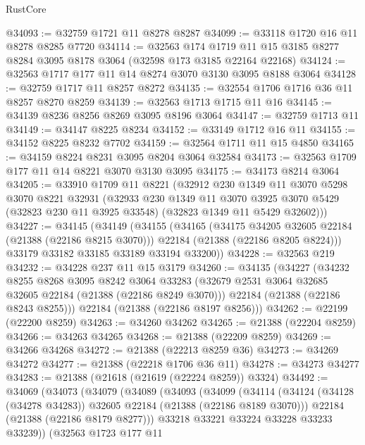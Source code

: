 \begin{lexlean}{RustCore}
\begin{coremodule}
@34093 := @32759 @1721 @11 @8278 @8287
@34099 := @33118 @1720 @16 @11 @8278 @8285 @7720
@34114 := @32563
    @174
    @1719
    @11
    @15
    @3185
    @8277
    @8284
    @3095
    @8178
    @3064
    (@32598 @173 @3185 @22164 @22168)
@34124 := @32563 @1717 @177 @11 @14 @8274 @3070 @3130 @3095 @8188 @3064
@34128 := @32759 @1717 @11 @8257 @8272
@34135 := @32554 @1706 @1716 @36 @11 @8257 @8270 @8259
@34139 := @32563 @1713 @1715 @11 @16
@34145 := @34139 @8236 @8256 @8269 @3095 @8196 @3064
@34147 := @32759 @1713 @11
@34149 := @34147 @8225 @8234
@34152 := @33149 @1712 @16 @11
@34155 := @34152 @8225 @8232 @7702
@34159 := @32564 @1711 @11 @15 @4850
@34165 := @34159 @8224 @8231 @3095 @8204 @3064 @32584
@34173 := @32563 @1709 @177 @11 @14 @8221 @3070 @3130 @3095
@34175 := @34173 @8214 @3064
@34205 := @33910
    @1709
    @11
    @8221
    (@32912
      @230
      @1349
      @11
      @3070
      @5298
      @3070
      @8221
      @32931
      (@32933
        @230
        @1349
        @11
        @3070
        @3925
        @3070
        @5429
        (@32823 @230 @11 @3925 @33548)
        (@32823 @1349 @11 @5429 @32602)))
@34227 := @34145
    (@34149
      (@34155
        (@34165
          (@34175 @34205 @32605 @22184 (@21388 (@22186 @8215 @3070)))
          @22184
          (@21388 (@22186 @8205 @8224)))
        @33179
        @33182
        @33185
        @33189
        @33194
        @33200))
@34228 := @32563 @219
@34232 := @34228 @237 @11 @15 @3179
@34260 := @34135
    (@34227
      (@34232
        @8255
        @8268
        @3095
        @8242
        @3064
        @33283
        (@32679 @2531 @3064 @32685 @32605 @22184 (@21388 (@22186 @8249 @3070)))
        @22184
        (@21388 (@22186 @8243 @8255)))
      @22184
      (@21388 (@22186 @8197 @8256)))
@34262 := @22199 (@22200 @8259)
@34263 := @34260 @34262
@34265 := @21388 (@22204 @8259)
@34266 := @34263 @34265
@34268 := @21388 (@22209 @8259)
@34269 := @34266 @34268
@34272 := @21388 (@22213 @8259 @36)
@34273 := @34269 @34272
@34277 := @21388 (@22218 @1706 @36 @11)
@34278 := @34273 @34277
@34283 := @21388 (@21618 (@21619 (@22224 @8259)) @3324)
@34492 := @34069
    (@34073
      (@34079
        (@34089
          (@34093
            (@34099
              (@34114
                (@34124 (@34128 (@34278 @34283)) @32605 @22184 (@21388 (@22186 @8189 @3070)))
                @22184
                (@21388 (@22186 @8179 @8277)))
              @33218
              @33221
              @33224
              @33228
              @33233
              @33239))
          (@32563
            @1723
            @177
            @11

\end{coremodule}
\end{lexlean}

